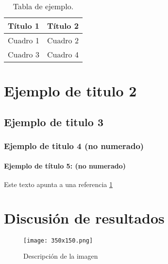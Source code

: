       \begin{table}[h]
      \begin{center} %
      \caption{Tabla de ejemplo.}
         \begin{tabular}{l c} %
            \hline %
            \hline
            Título 1 & Título 2 \\  %
            \hline
            Cuadro 1 & Cuadro 2 \\  %
            Cuadro 3 & Cuadro 4 \\
            \hline
            \hline
         \end{tabular}
         \label{tablaUno}
      \end{center}
      \end{table}


      \section{Ejemplo de titulo 2}
         \lipsum[1]
      \subsection{Ejemplo de titulo 3}
            \lipsum[1]
      \subsubsection{Ejemplo de titulo 4 (no numerado)}
            \lipsum[1]
      \paragraph{Ejemplo de título 5: (no numerado)}
               \lipsum[1]

      Este texto apunta a una referencia \ref{imagendesc}

      \section{Discusión de resultados}
         \lipsum[1-2]
         \begin{figure}[h]
            \centering
            \texttt{[image: 350x150.png]}
            \caption{Descripción de la imagen}
            \label{imagendesc}
         \end{figure}
